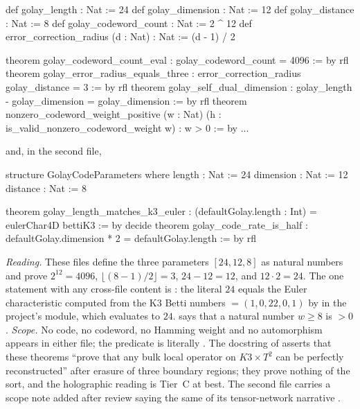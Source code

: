 \begin{leanbox}
\begin{leancode}
def golay_length : Nat := 24
def golay_dimension : Nat := 12
def golay_distance : Nat := 8
def golay_codeword_count : Nat := 2 ^ 12
def error_correction_radius (d : Nat) : Nat := (d - 1) / 2

theorem golay_codeword_count_eval : golay_codeword_count = 4096 := by rfl
theorem golay_error_radius_equals_three :
    error_correction_radius golay_distance = 3 := by rfl
theorem golay_self_dual_dimension :
    golay_length - golay_dimension = golay_dimension := by rfl
theorem nonzero_codeword_weight_positive (w : Nat)
    (h : is_valid_nonzero_codeword_weight w) : w > 0 := by ...
\end{leancode}
and, in the second file,
\begin{leancode}
structure GolayCodeParameters where
  length : Nat := 24
  dimension : Nat := 12
  distance : Nat := 8

theorem golay_length_matches_k3_euler :
    (defaultGolay.length : Int) = eulerChar4D bettiK3 := by decide
theorem golay_code_rate_is_half :
    defaultGolay.dimension * 2 = defaultGolay.length := by rfl
\end{leancode}
\emph{Reading.} These files define the three parameters $[24,12,8]$ as natural numbers and
prove $2^{12}=4096$, $\lfloor(8-1)/2\rfloor=3$, $24-12=12$, and $12\cdot2=24$. The one
statement with any cross-file content is : the
literal $24$ equals the Euler characteristic computed from the K3 Betti numbers
 $=(1,0,22,0,1)$ by  in the project's 
module, which  evaluates to $24$. 
says that a natural number $w\ge8$ is $>0$. \emph{Scope.} No code, no codeword, no
Hamming weight and no automorphism appears in either file; the predicate
 is literally . The docstring of
 asserts that these theorems ``prove that any bulk local operator on
$K3\times T^2$ can be perfectly reconstructed'' after erasure of three boundary regions; they
prove nothing of the sort, and the holographic reading is Tier~C at best. The second file
carries a scope note added after review saying the same of its tensor-network narrative
.
\end{leanbox}

